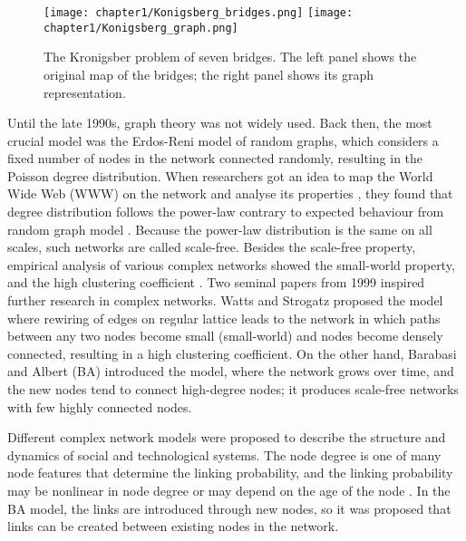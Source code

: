 \begin{figure}[!ht]
	\centering
	\texttt{[image: chapter1/Konigsberg\_bridges.png]} \hspace{2cm}
	\texttt{[image: chapter1/Konigsberg\_graph.png]}
	\caption[Konigsberg problem of seven bridges.]{The Kronigsber problem of seven bridges. The left panel shows the original map of the bridges; the right panel shows its graph representation. }
	
	\label{fig:Krgraph}
\end{figure}

Until the late 1990s, graph theory was not widely used. Back then, the most crucial model was the Erdos-Reni model of random graphs, which considers a fixed number of nodes in the network connected randomly, resulting in the Poisson degree distribution. When researchers got an idea to map the World Wide Web (WWW) on the network and analyse its properties \cite{huberman1999}, they found that degree distribution follows the power-law contrary to expected behaviour from random graph model \cite{dorogovtsev2010complex}. Because the power-law distribution is the same on all scales, such networks are called scale-free. Besides the scale-free property, empirical analysis of various complex networks showed the small-world property, and the high clustering coefficient \cite{barabasi2009,newman2010}. Two seminal papers from 1999 inspired further research in complex networks. Watts and Strogatz \cite{watts1998collective} proposed the model where rewiring of edges on regular lattice leads to the network in which paths between any two nodes become small (small-world) and nodes become densely connected, resulting in a high clustering coefficient. On the other hand, Barabasi and Albert (BA) \cite{barabasi1999} introduced the model, where the network grows over time, and the new nodes tend to connect high-degree nodes; it produces scale-free networks with few highly connected nodes. 

Different complex network models were proposed to describe the structure and dynamics of social and technological systems. The node degree is one of many node features that determine the linking probability, and the linking probability may be nonlinear in node degree or may depend on the age of the node \cite{dorogovtsev2000b, dorogovtsev2001b}. In the BA model, the links are introduced through new nodes, so it was proposed that links can be created between existing nodes in the network.  

